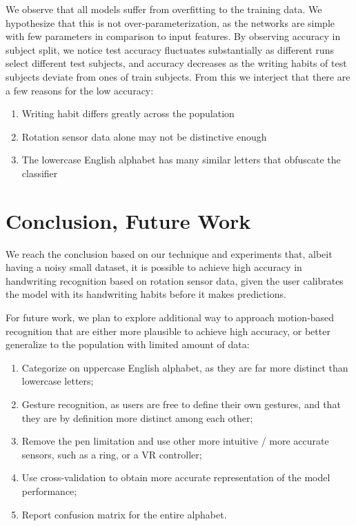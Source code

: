 \documentclass{article}
\begin{document}
\begin{multicols*}{2}
We observe that all models suffer from overfitting to the training data. We hypothesize that this is not over-parameterization, as the networks are simple with few parameters in comparison to input features. By observing accuracy in subject split, we notice test accuracy fluctuates substantially as different runs select different test subjects, and accuracy decreases as the writing habits of test subjects deviate from ones of train subjects. From this we interject that there are a few reasons for the low accuracy:

\begin{enumerate}[label=-]
    \item Writing habit differs greatly across the population
    \item Rotation sensor data alone may not be distinctive enough
    \item The lowercase English alphabet has many similar letters that obfuscate the classifier
\end{enumerate}

\section{Conclusion, Future Work}

We reach the conclusion based on our technique and experiments that, albeit having a noisy small dataset, it is possible to achieve high accuracy in handwriting recognition based on rotation sensor data, given the user calibrates the model with its handwriting habits before it makes predictions. 

For future work, we plan to explore additional way to approach motion-based recognition that are either more plausible to achieve high accuracy, or better generalize to the population with limited amount of data:

\begin{enumerate}[label=-]
    \item Categorize on uppercase English alphabet, as they are far more distinct than lowercase letters;
    \item Gesture recognition, as users are free to define their own gestures, and that they are by definition more distinct among each other;
    \item Remove the pen limitation and use other more intuitive / more accurate sensors, such as a ring, or a VR controller;
    \item Use cross-validation to obtain more accurate representation of the model performance;
    \item Report confusion matrix for the entire alphabet.
\end{enumerate}



\end{multicols*}
\end{document}
